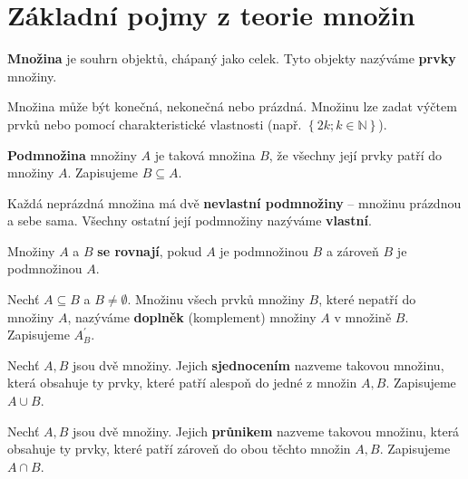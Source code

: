 \section{Základní pojmy z teorie množin}


\begin{definition}
  \textbf{Množina} je souhrn objektů, chápaný jako celek. Tyto objekty nazýváme \textbf{prvky} množiny.
\end{definition}

\begin{pozn}
Množina může být konečná, nekonečná nebo prázdná. Množinu lze zadat výčtem prvků nebo pomocí charakteristické vlastnosti (např. $\left \{ 2k; k \in \mathbb{N}\right\}$).

\end{pozn}

\begin{definition}
  \textbf{Podmnožina} množiny $A$ je taková množina $B$, že všechny její prvky patří do množiny $A$.
  Zapisujeme $B \subseteq A$.
\end{definition}

\begin{pozn}
Každá neprázdná množina má dvě \textbf{nevlastní podmnožiny} -- množinu prázdnou a sebe sama.
Všechny ostatní její podmnožiny nazýváme \textbf{vlastní}.

\end{pozn}
\begin{definition}
  Množiny $A$ a $B$ \textbf{se rovnají}, pokud $A$ je podmnožinou $B$ a zároveň $B$ je podmnožinou $A$.
\end{definition}

\begin{definition}
  Nechť $A \subseteq B$ a $B\neq \emptyset$. Množinu všech prvků množiny $B$, které nepatří do množiny $A$, nazýváme \textbf{doplněk} (komplement) množiny $A$ v množině $B$. Zapisujeme $A_B^\prime.$
\end{definition}

\begin{definition}
  Nechť $A, B$ jsou dvě množiny. Jejich \textbf{sjednocením} nazveme takovou množinu, která obsahuje ty prvky, které patří alespoň do jedné z množin $A, B$. Zapisujeme $A \cup B$.
\end{definition}

\begin{definition}
  Nechť $A, B$ jsou dvě množiny. Jejich \textbf{průnikem} nazveme takovou množinu, která obsahuje ty prvky, které patří zároveň do obou těchto množin $A, B$. Zapisujeme $A \cap B$.
\end{definition}

